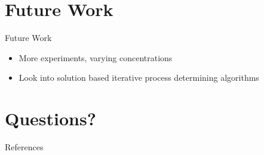 \documentclass{beamer}
\begin{document}
\section{Future Work}
\begin{frame}
\sectionpage
\end{frame}

\begin{frame}{Future Work}
\begin{itemize}
\item{More experiments, varying concentrations}
\item{Look into solution based iterative process determining algorithms}
\end{itemize}
\end{frame}

\appendix
\section{Questions?}
\begin{frame}
\sectionpage
\end{frame}

\begin{frame}[allowframebreaks]{References}
\def\newblock{}
\nocite{*}
\scriptsize{}

\end{frame}
\end{document}
